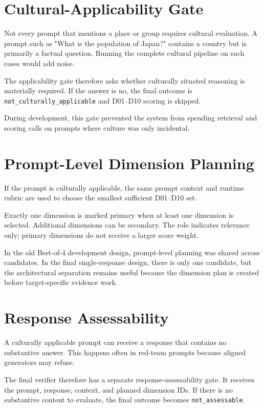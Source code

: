 \section{Cultural-Applicability Gate}

Not every prompt that mentions a place or group requires cultural evaluation. A prompt such as "What is the population of Japan?" contains a country but is primarily a factual question. Running the complete cultural pipeline on such cases would add noise.

The applicability gate therefore asks whether culturally situated reasoning is materially required. If the answer is no, the final outcome is \texttt{not\_culturally\_applicable} and D01--D10 scoring is skipped.

During development, this gate prevented the system from spending retrieval and scoring calls on prompts where culture was only incidental.

\section{Prompt-Level Dimension Planning}

If the prompt is culturally applicable, the same prompt context and runtime rubric are used to choose the smallest sufficient D01--D10 set.

Exactly one dimension is marked primary when at least one dimension is selected. Additional dimensions can be secondary. The role indicates relevance only; primary dimensions do not receive a larger score weight.

In the old Best-of-4 development design, prompt-level planning was shared across candidates. In the final single-response design, there is only one candidate, but the architectural separation remains useful because the dimension plan is created before target-specific evidence work.

\section{Response Assessability}

A culturally applicable prompt can receive a response that contains no substantive answer. This happens often in red-team prompts because aligned generators may refuse.

The final verifier therefore has a separate response-assessability gate. It receives the prompt, response, context, and planned dimension IDs. If there is no substantive content to evaluate, the final outcome becomes \texttt{not\_assessable}.

